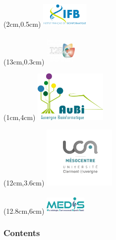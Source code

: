 \begin{frame}
  \titlepage
  \begin{textblock*}{5cm}(2cm,0.5cm) %
  \includegraphics[width=2.3cm,height=1.3cm]{images/logo_ifb.pdf}
  \end{textblock*}
  \begin{textblock*}{5cm}(13cm,0.3cm) %
  \includegraphics[width=1.5cm,height=1.5cm]{images/i2bc.png}
  \end{textblock*}
  \begin{textblock*}{5cm}(1cm,4cm) %
  \includegraphics[width=3.5cm,height=2.5cm]{images/logoAuBi-2019.pdf}
  \end{textblock*}
  \begin{textblock*}{5cm}(12cm,3.6cm) %
  \includegraphics[width=3.5cm,height=3cm]{images/mesocentre.png}
  \end{textblock*}
   \begin{textblock*}{5cm}(12.8cm,6cm) %
  \includegraphics[width=2cm,height=1cm]{images/medis_logo.png}
  \end{textblock*}
\end{frame}

\begin{frame}
  \frametitle{Contents}
  \begin{multicols*}{2}
  \tableofcontents
  \end{multicols*}
\end{frame}
